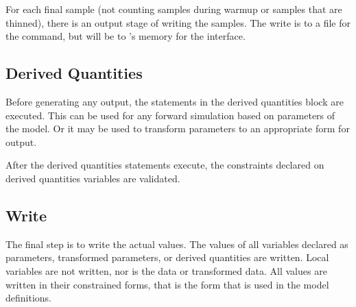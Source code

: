 For each final sample (not counting samples during warmup or samples
that are thinned), there is an output stage of writing the samples.
The write is to a file for the \Stan command, but will be to \R's memory
for the \R interface.

\subsection{Derived Quantities} 

Before generating any output, the statements in the derived quantities 
block are executed.  This can be used for any forward simulation based
on parameters of the model.  Or it may be used to transform parameters
to an appropriate form for output.  

After the derived quantities statements execute, the constraints
declared on derived quantities variables are validated.  

\subsection{Write}

The final step is to write the actual values.  The values of all
variables declared as parameters, transformed parameters, or derived
quantities are written.  Local variables are not written, nor is the
data or transformed data.  All values are written in their constrained
forms, that is the form that is used in the model definitions.





